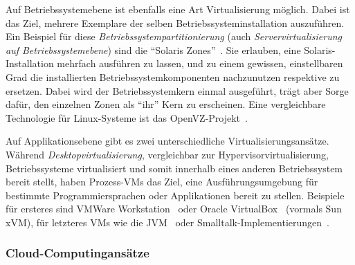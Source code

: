 Auf Betriebssystemebene ist ebenfalls eine Art Virtualisierung
möglich. Dabei ist das Ziel, mehrere Exemplare der selben
Betriebssysteminstallation auszuführen. Ein Beispiel für diese
\emph{Betriebssystempartitionierung} (auch \emph{Servervirtualisierung
  auf Betriebssystemebene}) sind die "`Solaris
Zones"'~\cite{price2004solaris}. Sie erlauben, eine
Solaris-Installation mehrfach ausführen zu lassen, und zu einem
gewissen, einstellbaren Grad die installierten
Betriebssystemkomponenten nachzunutzen respektive zu ersetzen. Dabei
wird der Betriebssystemkern einmal ausgeführt, trägt aber Sorge dafür,
den einzelnen Zonen als "`ihr"' Kern zu erscheinen. Eine vergleichbare
Technologie für Linux-Systeme ist das
OpenVZ-Projekt~\cite{ahmed2008server}.

Auf Applikationsebene gibt es zwei unterschiedliche
Virtualisierungsansätze. Während \emph{Desktopvirtualisierung},
vergleichbar zur Hypervisorvirtualisierung, Betriebssysteme
virtualisiert und somit innerhalb eines anderen Betriebssystem bereit
stellt, haben Prozess-\acp{VM} das Ziel, eine Ausführungsumgebung für
bestimmte Programmiersprachen oder Applikationen bereit zu stellen.
Beispiele für ersteres sind VMWare
Workstation~\cite{VMWare-Inc:VMware-Workstat} oder Oracle
VirtualBox~\cite{Oracle-Corporation:VirtualBox} (vormals Sun xVM), für
letzteres \acp{VM} wie die
JVM~\cite{Sun-Developer-Network2003:The-Java-Virtua} oder
Smalltalk-Implementierungen~\cite{ansiSmalltalk}.

\subsubsection{Cloud-Computingansätze}


